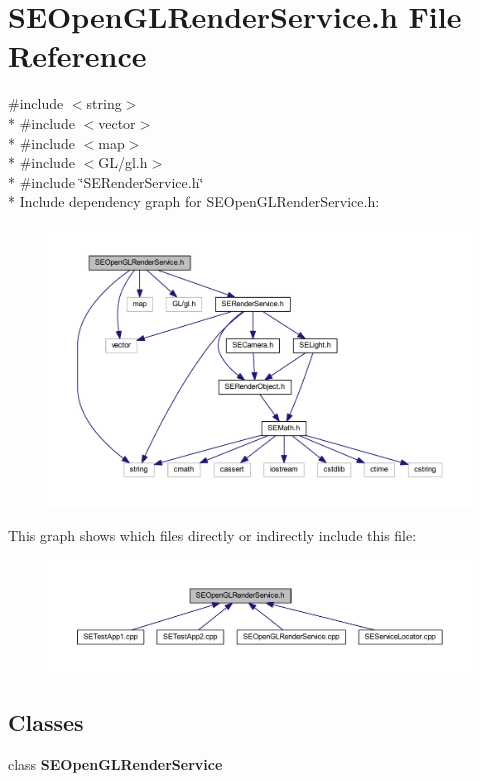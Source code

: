 \section{S\+E\+Open\+G\+L\+Render\+Service.\+h File Reference}
\label{_s_e_open_g_l_render_service_8h}
{\ttfamily \#include $<$string$>$}\\*
{\ttfamily \#include $<$vector$>$}\\*
{\ttfamily \#include $<$map$>$}\\*
{\ttfamily \#include $<$G\+L/gl.\+h$>$}\\*
{\ttfamily \#include \char`\"{}S\+E\+Render\+Service.\+h\char`\"{}}\\*
Include dependency graph for S\+E\+Open\+G\+L\+Render\+Service.\+h\+:
\nopagebreak
\begin{figure}[H]
\begin{center}
\leavevmode
\includegraphics[width=350pt]{_s_e_open_g_l_render_service_8h__incl}
\end{center}
\end{figure}
This graph shows which files directly or indirectly include this file\+:
\nopagebreak
\begin{figure}[H]
\begin{center}
\leavevmode
\includegraphics[width=350pt]{_s_e_open_g_l_render_service_8h__dep__incl}
\end{center}
\end{figure}
\subsection*{Classes}
\begin{DoxyCompactItemize}
\item 
class {\bf S\+E\+Open\+G\+L\+Render\+Service}
\end{DoxyCompactItemize}
